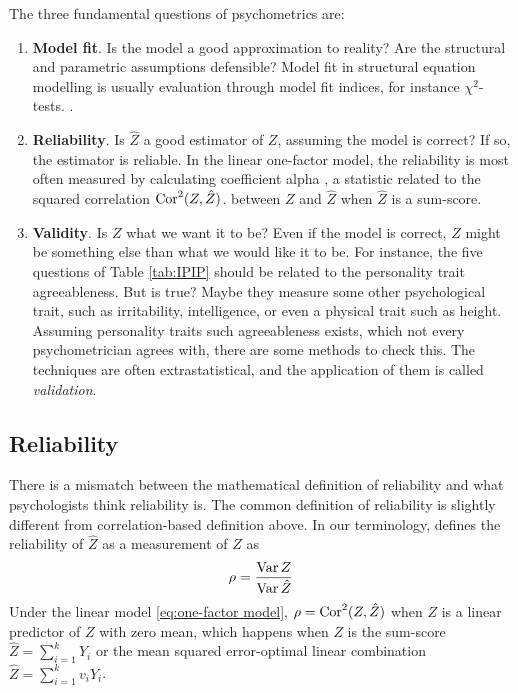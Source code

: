 The three fundamental questions of psychometrics are:
\begin{enumerate}
\item \textbf{Model fit}. Is the model a good approximation to reality? Are the structural and parametric assumptions defensible? Model fit in structural equation modelling is usually evaluation through model fit indices, for instance $\chi^{2}$-tests. \parencite[Chapter 15]{Mulaik2009-gc}.
\item \textbf{Reliability}. Is $\hat{Z}$ a good estimator of $Z$, assuming the model is correct? If so, the estimator is reliable. In the linear one-factor model, the reliability is most often measured by calculating coefficient alpha \parencite{Cronbach1951-in}, a statistic related to the squared correlation $\operatorname{Cor}^{2}(Z,\hat{Z})$. between $Z$ and $\hat{Z}$ when $\hat{Z}$ is a sum-score.
\item \textbf{Validity}. Is $Z$ what we want it to be? Even if the model is correct, $Z$ might be something else than what we would like it to be. For instance, the five questions of Table \ref{tab:IPIP} should be related to the personality trait agreeableness. But is true? Maybe they measure some other psychological trait, such as irritability, intelligence, or even a physical trait such as height. Assuming personality traits such agreeableness exists, which not every psychometrician agrees with, there are some methods to check this. The techniques are often extrastatistical, and the application of them is called \emph{validation}. \parencite[Chapter 6]{Borsboom2005-iq}
\end{enumerate}

\subsection{Reliability}

There is a mismatch between the mathematical definition of reliability and what psychologists think reliability is. The common definition of reliability is slightly different from correlation-based definition above. In our terminology, \textcite[Equation 3]{Raykov2019-yr} defines the reliability of $\hat{Z}$ as a measurement of $Z$ as
\begin{equation}
\rho=\frac{\operatorname{Var} Z}{\operatorname{Var}\hat{Z}}\label{eq:rakov-reliabiliy}
\end{equation} Under the linear model \eqref{eq:one-factor model}, $\rho = \operatorname{Cor}^2(Z,\hat{Z})$ when $Z$ is a linear predictor of $Z$ with zero mean, which happens when $Z$ is the sum-score $\hat{Z}=\sum_{i=1}^{k}Y_{i}$ or the mean squared error-optimal linear combination $\hat{Z}=\sum_{i=1}^{k}v_{i}Y_{i}$.

